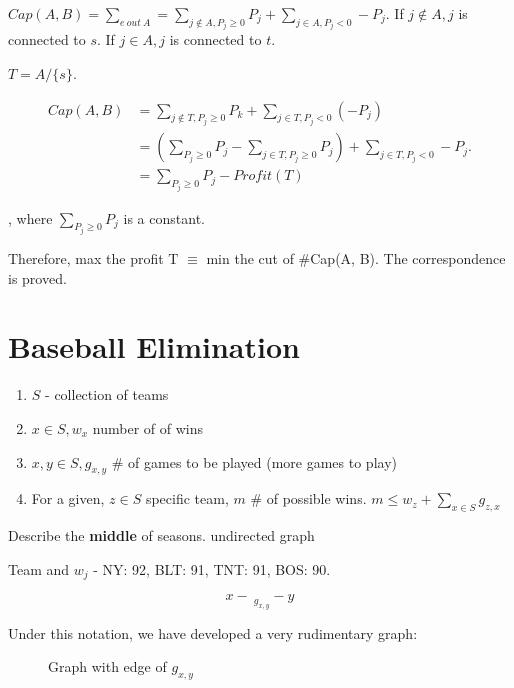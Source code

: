 \documentclass[a4paper]{report}
\theoremstyle{definition}
\begin{document}
$Cap(A, B)=\sum_{e~out~A} = \sum_{j \notin A, P_j\geq 0}P_j+\sum_{j \in A, P_j<0}-P_j$. If $j \notin A, j$ is connected to $s$. If $j \in A, j$ is connected to $t$.

$T=A/\{s\}$.

\begin{align*}
Cap(A, B)&=\sum_{j\notin T, P_j\geq 0}P_k+\sum_{j\in T, P_j <0}(-P_j) \\
&= (\sum_{P_j\geq 0}P_j-\sum_{j \in T, P_j\geq 0}P_j)+\sum_{j\in T, P_j <0}-P_j.\\
&=  \sum_{P_j\geq 0}P_j - Profit(T)
\end{align*}

, where $\sum_{P_j\geq 0}P_j$ is a constant.

Therefore, max the profit T $\equiv$ min the cut of #Cap(A, B). The correspondence is proved.


\section{Baseball Elimination}
\begin{enumerate}
\item $S$ - collection of teams
\item $x\in S, w_x$ number of of wins
\item $x, y \in S, g_{x, y}$  \# of games to be played (more games to play)
\item For a given, $z\in S$ specific team, $m$ \# of possible wins. $m \leq w_z+\sum_{x\in S} g_{z,x}$
\end{enumerate}

Describe the \textbf{middle} of seasons. undirected graph

Team and $w_j$ - NY: 92, BLT: 91, TNT: 91, BOS: 90.

$$x -\ _{g_{x, y}} - y$$


Under this notation, we have developed a very rudimentary graph:
\begin{figure}[!htp]
\centering
{}
\caption{Graph with edge of $g_{x,y}$}
\label{fig:baseball0}
\end{figure}
\end{document}

